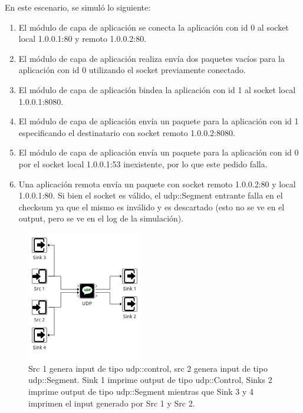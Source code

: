 \documentclass[10pt,a4paper]{article}
\begin{document}
En este escenario, se simuló lo siguiente:
\begin{enumerate}
\item El módulo de capa de aplicación se conecta la aplicación con id 0 al socket local 1.0.0.1:80 y remoto 1.0.0.2:80.
\item El módulo de capa de aplicación realiza envía dos paquetes vacíos para la aplicación con id 0 utilizando el socket previamente conectado.
\item El módulo de capa de aplicación bindea la aplicación con id 1 al socket local 1.0.0.1:8080.
\item El módulo de capa de aplicación envía un paquete para la aplicación con id 1 especificando el destinatario con socket remoto 1.0.0.2:8080.
\item El módulo de capa de aplicación envía un paquete para la aplicación con id 0 por el socket local 1.0.0.1:53 inexistente, por lo que este pedido falla.
\item Una aplicación remota envía un paquete con socket remoto 1.0.0.2:80 y local 1.0.0.1:80. Si bien el socket es válido, el udp::Segment entrante falla en el checksum ya que el mismo es inválido y es descartado (esto no se ve en el output, pero se ve en el log de la simulación).
\end{enumerate}

\begin{figure}[!t]
    \centering
    \includegraphics[width = 0.45\textwidth]{img/png/unit_tests/udp.png}
    \caption{Src 1 genera input de tipo udp::control, src 2 genera input de tipo udp::Segment. Sink 1 imprime output de tipo udp::Control, Sinks 2 imprime output de tipo udp::Segment mientras que Sink 3 y 4 imprimen el input generado por Src 1 y Src 2.}
    \label{figure: unit test udp}
\end{figure}

\newpage
\end{document}
